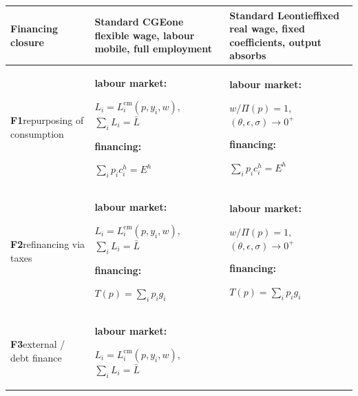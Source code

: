 \begin{table}[htbp]
\centering
\footnotesize
\setlength{\tabcolsep}{4pt}
\setlength{\parindent}{0pt}
\setlength{\parskip}{0pt}
\renewcommand{\arraystretch}{1.3}
\newcommand{\tblk}[1]{\textbf{#1:}}
\newcommand{\tcond}[1]{\par\hspace{1em}#1}
\begin{tabular}{@{}>{\raggedright\arraybackslash}p{2.2cm}
                  >{\raggedright\arraybackslash}p{6.2cm}
                  >{\raggedright\arraybackslash}p{6.2cm}@{}}
\toprule
\textbf{Financing closure}
& \textbf{Standard CGE}\newline \scriptsize one flexible wage, labour mobile, full employment
& \textbf{Standard Leontief}\newline \scriptsize fixed real wage, fixed coefficients, output absorbs \\
\midrule
\textbf{F1}\newline \scriptsize repurposing of consumption
& \tblk{labour market}\tcond{$L_{i} = L_{i}^{\mathrm{cm}}(p, y_{i}, w)$, \quad $\textstyle\sum_{i} L_{i} = \bar L$}\par
  \vspace{6pt}
  \tblk{financing}\tcond{$\textstyle\sum_{i} p_{i} c_{i}^{h} = E^{h}$}
& \tblk{labour market}\tcond{$w/\Pi(p) = 1$, \quad $(\theta, \epsilon, \sigma) \to 0^{+}$}\par
  \vspace{6pt}
  \tblk{financing}\tcond{$\textstyle\sum_{i} p_{i} c_{i}^{h} = E^{h}$} \\
\midrule
\textbf{F2}\newline \scriptsize refinancing via taxes
& \tblk{labour market}\tcond{$L_{i} = L_{i}^{\mathrm{cm}}(p, y_{i}, w)$, \quad $\textstyle\sum_{i} L_{i} = \bar L$}\par
  \vspace{6pt}
  \tblk{financing}\tcond{$T(p) = \textstyle\sum_{i} p_{i} g_{i}$}
& \tblk{labour market}\tcond{$w/\Pi(p) = 1$, \quad $(\theta, \epsilon, \sigma) \to 0^{+}$}\par
  \vspace{6pt}
  \tblk{financing}\tcond{$T(p) = \textstyle\sum_{i} p_{i} g_{i}$} \\
\midrule
\textbf{F3}\newline \scriptsize external / debt finance
& \tblk{labour market}\tcond{$L_{i} = L_{i}^{\mathrm{cm}}(p, y_{i}, w)$, \quad $\textstyle\sum_{i} L_{i} = \bar L$}\par
  \vspace{6pt}

\end{tabular}
\end{table}
